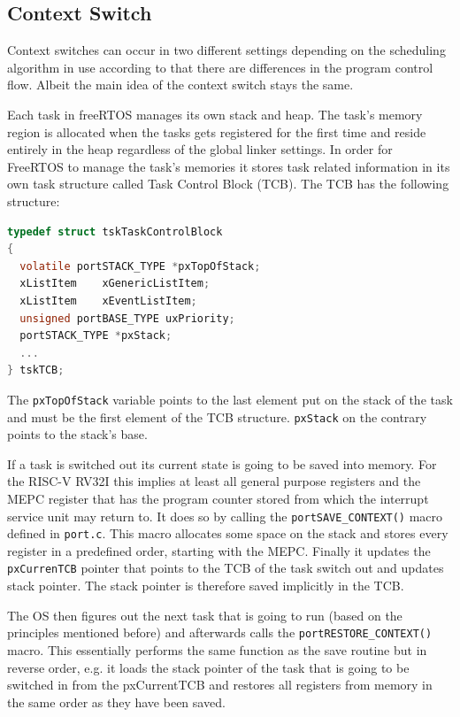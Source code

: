 \subsection{Context Switch}

Context switches can occur in two different settings depending on the scheduling algorithm in use according to that there are differences in the program control flow. Albeit the main idea of the context switch stays the same.

Each task in freeRTOS manages its own stack and heap. The task's memory region is allocated when the tasks gets registered for the first time and reside entirely in the heap regardless of the global linker settings. In order for FreeRTOS to manage the task's memories it stores task related information in its own task structure called Task Control Block (TCB). The TCB has the following structure:


\begin{lstlisting}[language=C,emph={xListItem,portSTACK_TYPE}]
typedef struct tskTaskControlBlock
{
  volatile portSTACK_TYPE *pxTopOfStack;
  xListItem    xGenericListItem;
  xListItem    xEventListItem;
  unsigned portBASE_TYPE uxPriority;
  portSTACK_TYPE *pxStack;
  ...
} tskTCB;
\end{lstlisting}

The \verb+pxTopOfStack+ variable points to the last element put on the stack of the task and must be the first element of the TCB structure. \verb+pxStack+ on the contrary points to the stack's base.

If a task is switched out its current state is going to be saved into memory. For the RISC-V RV32I this implies at least all general purpose registers and the MEPC register that has the program counter stored from which the interrupt service unit may return to. It does so by calling the \verb+portSAVE_CONTEXT()+ macro defined in \verb+port.c+. This macro allocates some space on the stack and stores every register in a predefined order, starting with the MEPC. Finally it updates the \verb+pxCurrenTCB+ pointer that points to the TCB of the task switch out and updates stack pointer. The stack pointer is therefore saved implicitly in the TCB.

The OS then figures out the next task that is going to run (based on the principles mentioned before) and afterwards calls the \verb+portRESTORE_CONTEXT()+ macro. This essentially performs the same function as the save routine but in reverse order, e.g. it loads the stack pointer of the task that is going to be switched in from the pxCurrentTCB and restores all registers from memory in the same order as they have been saved.

